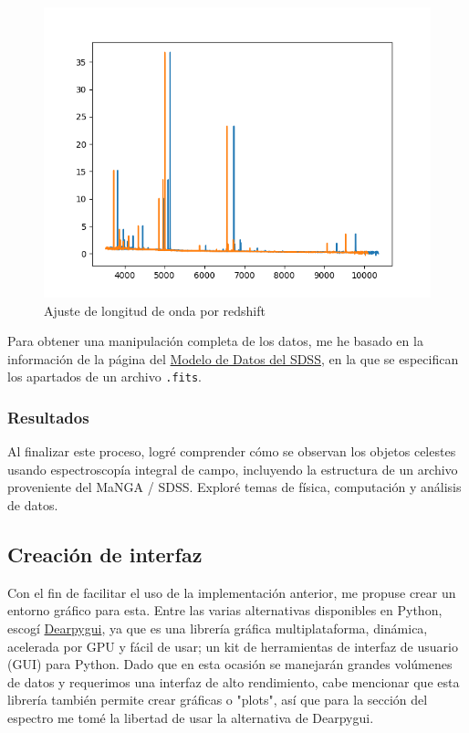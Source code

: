 \documentclass[9pt,twocolumn,a4paper]{opticajnl}
\begin{document}
\begin{figure}
    \centering
    \includegraphics[width=1\linewidth]{redshift_ajuste.png}
    \caption{Ajuste de longitud de onda por redshift}
    \label{fig:redshift_ajuste}
\end{figure}

Para obtener una manipulación completa de los datos, me he basado en la información de la página del \href{https://data.sdss.org/datamodel/files/MANGA_SPECTRO_DATA/MJD5/sdR.html}{Modelo de Datos del SDSS}, en la que se especifican los apartados de un archivo \verb|.fits|.

\subsubsection*{Resultados}
Al finalizar este proceso, logré comprender cómo se observan los objetos celestes usando espectroscopía integral de campo, incluyendo la estructura de un archivo proveniente del MaNGA / SDSS. Exploré temas de física, computación y análisis de datos.

\subsection*{Creación de interfaz}
Con el fin de facilitar el uso de la implementación anterior, me propuse crear un entorno gráfico para esta. Entre las varias alternativas disponibles en Python, escogí \href{https://dearpygui.readthedocs.io/en/latest/}{Dearpygui}, ya que es una librería gráfica multiplataforma, dinámica, acelerada por GPU y fácil de usar; un kit de herramientas de interfaz de usuario (GUI) para Python. Dado que en esta ocasión se manejarán grandes volúmenes de datos y requerimos una interfaz de alto rendimiento, cabe mencionar que esta librería también permite crear gráficas o "plots", así que para la sección del espectro me tomé la libertad de usar la alternativa de Dearpygui.
\end{document}
